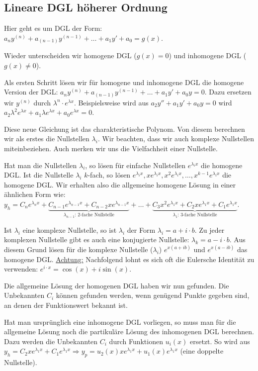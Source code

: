 \subsection{Lineare DGL höherer Ordnung}
Hier geht es um DGL der Form:
$a_n y^{(n)}+a_{(n-1)}y^{(n-1)}+\ldots+a_1 y'+a_0=g(x)$.

Wieder unterscheiden wir homogene DGL ($g(x) = 0$) und inhomogene DGL ($g(x) \neq 0$).

Als ersten Schritt lösen wir für homogene und inhomogene DGL die homogene Version der DGL:
$a_n y^{(n)}+a_{(n-1)}y^{(n-1)}+\ldots+a_1 y'+a_0 y = 0$. Dazu ersetzen wir $y^{(n)}$ durch
$\lambda^n \cdot e^{\lambda x}$. Beispielsweise wird aus $a_2 y'' + a_1 y' + a_0 y = 0$ wird
$a_2 \lambda^2 e^{\lambda x} + a_1 \lambda e^{\lambda x} + a_0 e^{\lambda x} = 0$.

Diese neue Gleichung ist das charakteristische Polynom. Von diesem berechnen wir
als erstes die Nullstellen $\lambda_i$. Wir beachten, dass wir auch komplexe Nullstellen
miteinbeziehen. Auch merken wir uns die Vielfachheit einer Nullstelle.

Hat man die Nullstellen $\lambda_i$, so lösen für einfache Nullstellen $e^{\lambda_i x}$
die homogene DGL. Ist die Nullstelle $\lambda_i$ $k$-fach, so lösen
$e^{\lambda_i x}, x e^{\lambda_i x}, x^2 e^{\lambda_i x}, \ldots, x^{k-1} e^{\lambda_i x}$
die homogene DGL. Wir erhalten also die allgemeine homogene Lösung in einer ähnlichen Form wie:
$y_h = C_n e^{\lambda_n x} + 
\underbrace{C_{n-1} e^{\lambda_{n-1} x} + C_{n-2} x e^{\lambda_{n-1} x}}_{\lambda_{n-1} \text{: 2-fache Nullstelle}} + \ldots + 
\underbrace{C_3 x^2 e^{\lambda_1 x} + C_2 x e^{\lambda_1 x} + C_1 e^{\lambda_1 x}}_{\lambda_1 \text{: 3-fache Nullstelle}}$.

Ist $\lambda_i$ eine komplexe Nullstelle, so ist $\lambda_i$ der Form $\lambda_i = a + i \cdot b$.
Zu jeder komplexen Nullstelle gibt es auch eine konjugierte Nullstelle: $\lambda_k = a - i \cdot b$.
Aus diesem Grund lösen für die komplexe Nullstelle ($\lambda_i$) $e^{x (a + ib)}$ und
$e^{x (a - ib)}$ das homogene DGL. \underline{Achtung:} Nachfolgend lohnt es sich oft die
Eulersche Identität zu verwenden: $e^{i \cdot x} = \cos(x) + i \sin(x)$.

Die allgemeine Lösung der homogenen DGL haben wir nun gefunden. Die Unbekannten $C_i$
können gefunden werden, wenn genügend Punkte gegeben sind, an denen der Funktionswert bekannt ist.

Hat man ursprünglich eine inhomogene DGL vorliegen, so muss man für die allgemeine Lösung
noch die partikuläre Lösung des inhomogenen DGL berechnen. Dazu werden die Unbekannten
$C_i$ durch Funktionen $u_i(x)$ ersetzt. So wird aus
$y_h = C_2 x e^{\lambda_1 x} + C_1 e^{\lambda_1 x} \Rightarrow
y_p = u_2(x) x e^{\lambda_1 x} + u_1(x) e^{\lambda_1 x}$ (eine doppelte Nullstelle).

